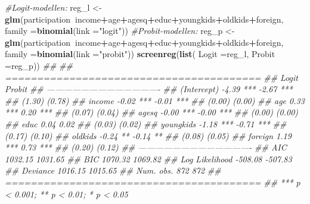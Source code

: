\documentclass[
  10pt,
]{article}
\newenvironment{Shaded}{\begin{snugshade}}{\end{snugshade}}
\newcommand{\CommentTok}[1]{\textcolor[rgb]{0.56,0.35,0.01}{\textit{#1}}}
\newcommand{\DataTypeTok}[1]{\textcolor[rgb]{0.13,0.29,0.53}{#1}}
\newcommand{\KeywordTok}[1]{\textcolor[rgb]{0.13,0.29,0.53}{\textbf{#1}}}
\newcommand{\NormalTok}[1]{#1}
\newcommand{\OperatorTok}[1]{\textcolor[rgb]{0.81,0.36,0.00}{\textbf{#1}}}
\newcommand{\StringTok}[1]{\textcolor[rgb]{0.31,0.60,0.02}{#1}}
\begin{document}
\begin{Shaded}
\begin{Highlighting}[]
\CommentTok{#Logit-modellen:}
\NormalTok{reg_l <-}\StringTok{ }\KeywordTok{glm}\NormalTok{(participation}\OperatorTok{~}\NormalTok{income}\OperatorTok{+}\NormalTok{age}\OperatorTok{+}\NormalTok{agesq}\OperatorTok{+}\NormalTok{educ}\OperatorTok{+}\NormalTok{youngkids}\OperatorTok{+}\NormalTok{oldkids}\OperatorTok{+}\NormalTok{foreign,}
             \DataTypeTok{family =}\KeywordTok{binomial}\NormalTok{(}\DataTypeTok{link =}\StringTok{"logit"}\NormalTok{)) }
\CommentTok{#Probit-modellen:}
\NormalTok{reg_p <-}\StringTok{ }\KeywordTok{glm}\NormalTok{(participation}\OperatorTok{~}\NormalTok{income}\OperatorTok{+}\NormalTok{age}\OperatorTok{+}\NormalTok{agesq}\OperatorTok{+}\NormalTok{educ}\OperatorTok{+}\NormalTok{youngkids}\OperatorTok{+}\NormalTok{oldkids}\OperatorTok{+}\NormalTok{foreign,}
             \DataTypeTok{family =}\KeywordTok{binomial}\NormalTok{(}\DataTypeTok{link =}\StringTok{"probit"}\NormalTok{))}
\KeywordTok{screenreg}\NormalTok{(}\KeywordTok{list}\NormalTok{( }\DataTypeTok{Logit =}\NormalTok{reg_l, }\DataTypeTok{Probit =}\NormalTok{reg_p))}
\CommentTok{## }
\CommentTok{## ========================================}
\CommentTok{##                 Logit        Probit     }
\CommentTok{## ----------------------------------------}
\CommentTok{## (Intercept)       -4.39 ***    -2.67 ***}
\CommentTok{##                   (1.30)       (0.78)   }
\CommentTok{## income            -0.02 ***    -0.01 ***}
\CommentTok{##                   (0.00)       (0.00)   }
\CommentTok{## age                0.33 ***     0.20 ***}
\CommentTok{##                   (0.07)       (0.04)   }
\CommentTok{## agesq             -0.00 ***    -0.00 ***}
\CommentTok{##                   (0.00)       (0.00)   }
\CommentTok{## educ               0.04         0.02    }
\CommentTok{##                   (0.03)       (0.02)   }
\CommentTok{## youngkids         -1.18 ***    -0.71 ***}
\CommentTok{##                   (0.17)       (0.10)   }
\CommentTok{## oldkids           -0.24 **     -0.14 ** }
\CommentTok{##                   (0.08)       (0.05)   }
\CommentTok{## foreign            1.19 ***     0.73 ***}
\CommentTok{##                   (0.20)       (0.12)   }
\CommentTok{## ----------------------------------------}
\CommentTok{## AIC             1032.15      1031.65    }
\CommentTok{## BIC             1070.32      1069.82    }
\CommentTok{## Log Likelihood  -508.08      -507.83    }
\CommentTok{## Deviance        1016.15      1015.65    }
\CommentTok{## Num. obs.        872          872       }
\CommentTok{## ========================================}
\CommentTok{## *** p < 0.001; ** p < 0.01; * p < 0.05}
\end{Highlighting}
\end{Shaded}
\end{document}
